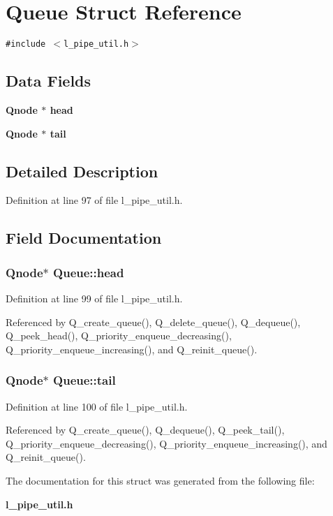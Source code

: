 \section{Queue Struct Reference}
\label{structQueue}
{\tt \#include $<$l\_\-pipe\_\-util.h$>$}

\subsection*{Data Fields}
\begin{CompactItemize}
\item 
\bf{Qnode} $\ast$ \bf{head}
\item 
\bf{Qnode} $\ast$ \bf{tail}
\end{CompactItemize}


\subsection{Detailed Description}




Definition at line 97 of file l\_\-pipe\_\-util.h.

\subsection{Field Documentation}
\subsubsection{\setlength{\rightskip}{0pt plus 5cm}\bf{Qnode}$\ast$ \bf{Queue::head}}\label{structQueue_ce2d277946f665c6b87a545102632cdf}




Definition at line 99 of file l\_\-pipe\_\-util.h.

Referenced by Q\_\-create\_\-queue(), Q\_\-delete\_\-queue(), Q\_\-dequeue(), Q\_\-peek\_\-head(), Q\_\-priority\_\-enqueue\_\-decreasing(), Q\_\-priority\_\-enqueue\_\-increasing(), and Q\_\-reinit\_\-queue().
\subsubsection{\setlength{\rightskip}{0pt plus 5cm}\bf{Qnode}$\ast$ \bf{Queue::tail}}\label{structQueue_fee6a6594dac629a1b7cb7d1b66c1242}




Definition at line 100 of file l\_\-pipe\_\-util.h.

Referenced by Q\_\-create\_\-queue(), Q\_\-dequeue(), Q\_\-peek\_\-tail(), Q\_\-priority\_\-enqueue\_\-decreasing(), Q\_\-priority\_\-enqueue\_\-increasing(), and Q\_\-reinit\_\-queue().

The documentation for this struct was generated from the following file:\begin{CompactItemize}
\item 
\bf{l\_\-pipe\_\-util.h}\end{CompactItemize}
